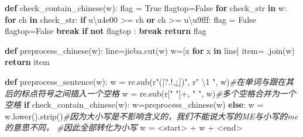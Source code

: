 \documentclass[
]{article}
\newenvironment{Shaded}{}{}
\newcommand{\CharTok}[1]{\textcolor[rgb]{0.25,0.44,0.63}{#1}}
\newcommand{\CommentTok}[1]{\textcolor[rgb]{0.38,0.63,0.69}{\textit{#1}}}
\newcommand{\ControlFlowTok}[1]{\textcolor[rgb]{0.00,0.44,0.13}{\textbf{#1}}}
\newcommand{\KeywordTok}[1]{\textcolor[rgb]{0.00,0.44,0.13}{\textbf{#1}}}
\newcommand{\NormalTok}[1]{#1}
\newcommand{\OperatorTok}[1]{\textcolor[rgb]{0.40,0.40,0.40}{#1}}
\newcommand{\StringTok}[1]{\textcolor[rgb]{0.25,0.44,0.63}{#1}}
\newcommand{\VariableTok}[1]{\textcolor[rgb]{0.10,0.09,0.49}{#1}}
\newcommand{\VerbatimStringTok}[1]{\textcolor[rgb]{0.25,0.44,0.63}{#1}}
\begin{document}
\begin{Shaded}
\begin{Highlighting}[]
\KeywordTok{def}\NormalTok{ check\_contain\_chinese(w):}
\NormalTok{    flag }\OperatorTok{=} \VariableTok{True}
\NormalTok{    flagtop}\OperatorTok{=}\VariableTok{False}
    \ControlFlowTok{for}\NormalTok{ check\_str }\KeywordTok{in}\NormalTok{ w:}
        \ControlFlowTok{for}\NormalTok{ ch }\KeywordTok{in}\NormalTok{ check\_str:}
            \ControlFlowTok{if} \StringTok{u\textquotesingle{}}\CharTok{\textbackslash{}u4e00}\StringTok{\textquotesingle{}} \OperatorTok{\textgreater{}=}\NormalTok{ ch }\KeywordTok{or}\NormalTok{ ch }\OperatorTok{\textgreater{}=} \StringTok{u\textquotesingle{}}\CharTok{\textbackslash{}u9fff}\StringTok{\textquotesingle{}}\NormalTok{:}
\NormalTok{                flag }\OperatorTok{=}  \VariableTok{False}
\NormalTok{                flagtop}\OperatorTok{=}\VariableTok{False}
                \ControlFlowTok{break}
        \ControlFlowTok{if} \KeywordTok{not}\NormalTok{ flagtop :}
                \ControlFlowTok{break}
    \ControlFlowTok{return}\NormalTok{ flag}

\KeywordTok{def}\NormalTok{ preprocess\_chinese(w):}
\NormalTok{    line}\OperatorTok{=}\NormalTok{jieba.cut(w)}
\NormalTok{    w}\OperatorTok{=}\NormalTok{[x }\ControlFlowTok{for}\NormalTok{ x }\KeywordTok{in}\NormalTok{ line]}
\NormalTok{    item}\OperatorTok{=}\StringTok{\textquotesingle{} \textquotesingle{}}\NormalTok{.join(w)}
    \ControlFlowTok{return}\NormalTok{ item}
    
\KeywordTok{def}\NormalTok{ preprocess\_sentence(w):}
\NormalTok{    w }\OperatorTok{=}\NormalTok{ re.sub(}\VerbatimStringTok{r"([?.!,¿])"}\NormalTok{, }\VerbatimStringTok{r" \textbackslash{}1 "}\NormalTok{, w)}\CommentTok{\#在单词与跟在其后的标点符号之间插入一个空格}
\NormalTok{    w }\OperatorTok{=}\NormalTok{ re.sub(}\VerbatimStringTok{r\textquotesingle{}[" "]+\textquotesingle{}}\NormalTok{, }\StringTok{" "}\NormalTok{, w)}\CommentTok{\#多个空格合并为一个空格}
    \ControlFlowTok{if}\NormalTok{ check\_contain\_chinese(w):}
\NormalTok{        w}\OperatorTok{=}\NormalTok{preprocess\_chinese(w)}
    \ControlFlowTok{else}\NormalTok{:}
\NormalTok{        w }\OperatorTok{=}\NormalTok{ w.lower().strip()}\CommentTok{\#因为大小写是不影响含义的，我们不能说大写的ME与小写的me的意思不同，							  \#因此全部转化为小写}
\NormalTok{    w }\OperatorTok{=} \StringTok{\textquotesingle{}\textless{}start\textgreater{} \textquotesingle{}} \OperatorTok{+}\NormalTok{ w }\OperatorTok{+} \StringTok{\textquotesingle{} \textless{}end\textgreater{}\textquotesingle{}}
\end{Highlighting}
\end{Shaded}
\end{document}
